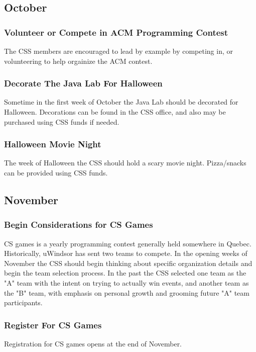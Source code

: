 \documentclass[12pt]{article}
\begin{document}
\subsection{October}

\subsubsection{Volunteer or Compete in ACM Programming Contest}
The CSS members are encouraged to lead by example by competing in, or volunteering
to help orgainize the ACM contest.

\subsubsection{Decorate The Java Lab For Halloween}
Sometime in the first week of October the Java Lab should be decorated
for Halloween. Decorations can be found in the CSS office, and also may be
purchased using CSS funds if needed.

\subsubsection{Halloween Movie Night}
The week of Halloween the CSS should hold a scary movie night.  Pizza/snacks
can be provided using CSS funds.

\subsection{November}

\subsubsection{Begin Considerations for CS Games}
CS games is a yearly programming contest generally held somewhere in Quebec.
Historically, uWindsor has sent two teams to compete.  In the opening weeks of
November the CSS should begin thinking about specific organization details and
begin the team selection process.  In the past the CSS selected one team as the
"A" team with the intent on trying to actually win events, and another team as the
"B" team, with emphasis on personal growth and grooming future "A" team participants.

\subsubsection{Register For CS Games}
Registration for CS games opens at the end of November.
\end{document}
